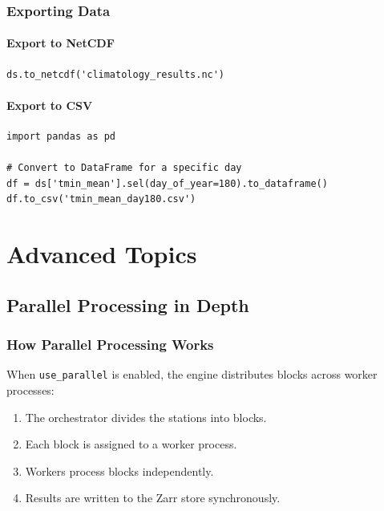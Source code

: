 ﻿\documentclass[12pt,a4paper]{report}
\begin{document}
\subsection{Exporting Data}
\subsubsection{Export to NetCDF}
\begin{lstlisting}[caption=Exporting to NetCDF]
ds.to_netcdf('climatology_results.nc')
\end{lstlisting}

\subsubsection{Export to CSV}
\begin{lstlisting}[caption=Exporting to CSV]
import pandas as pd

# Convert to DataFrame for a specific day
df = ds['tmin_mean'].sel(day_of_year=180).to_dataframe()
df.to_csv('tmin_mean_day180.csv')
\end{lstlisting}

\chapter{Advanced Topics}

\section{Parallel Processing in Depth}

\subsection{How Parallel Processing Works}
When \texttt{use\_parallel} is enabled, the engine distributes blocks across worker processes:

\begin{enumerate}
    \item The orchestrator divides the stations into blocks.
    \item Each block is assigned to a worker process.
    \item Workers process blocks independently.
    \item Results are written to the Zarr store synchronously.
\end{enumerate}
\end{document}

